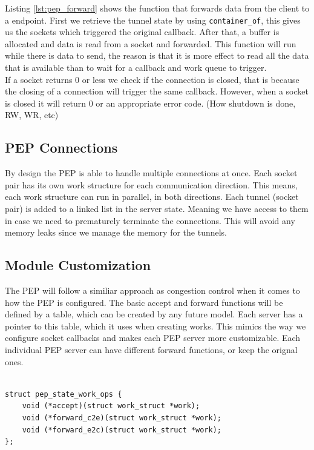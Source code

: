 \documentclass[a4paper,english, 11pt]{report}
\begin{document}
Listing \ref{lst:pep_forward} shows the function that forwards data from the client to a endpoint. First we retrieve the tunnel state by using \verb|container_of|, this gives us the sockets which triggered the original callback. After that, a buffer is allocated and data is read from a socket and forwarded. This function will run while there is data to send, the reason is that it is more effect to read all the data that is available than to wait for a callback and work queue to trigger.\\

If a socket returns 0 or less we check if the connection is closed, that is because the closing of a connection will trigger the same callback. However, when a socket is closed it will return 0 or an appropriate error code. (How shutdown is done, RW, WR, etc)

\subsection{PEP Connections}
By design the PEP is able to handle multiple connections at once. Each socket pair has its own work structure for each communication direction. This means, each work structure can run in parallel, in both directions. Each tunnel (socket pair) is added to a linked list in the server state. Meaning we have access to them in case we need to prematurely terminate the connections. This will avoid any memory leaks since we manage the memory for the tunnels.\\

\subsection{Module Customization}
The PEP will follow a similiar approach as congestion control when it comes to how the PEP is configured. The basic accept and forward functions will be defined by a table, which can be created by any future model. Each server has a pointer to this table, which it uses when creating works. This mimics the way we configure socket callbacks and makes each PEP server more customizable. Each individual PEP server can have different forward functions, or keep the orignal ones.\\\\

\noindent\begin{minipage}{\linewidth}
\begin{verbatim}
struct pep_state_work_ops {
    void (*accept)(struct work_struct *work);
    void (*forward_c2e)(struct work_struct *work);
    void (*forward_e2c)(struct work_struct *work);
};
\end{verbatim}
\end{minipage}\\
\end{document}
